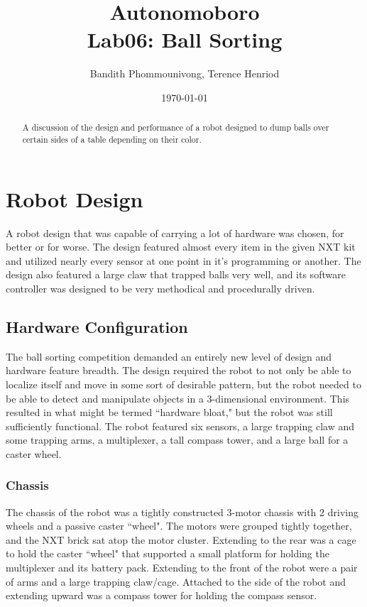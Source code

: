 \documentclass{article}
\title{Autonomoboro \\ Lab06: Ball Sorting}
\author{Bandith Phommounivong, Terence Henriod}
\date{\today}
\begin{document}
\maketitle

\begin{abstract}
A discussion of the design and performance of a robot designed to dump balls over certain sides of a table depending on their color.
\end{abstract}

\newpage
\section{Robot Design}
A robot design that was capable of carrying a lot of hardware was chosen, for better or for worse. The design featured almost every item in the given NXT kit and utilized nearly every sensor at one point in it's programming or another. The design also featured a large claw that trapped balls very well, and its software controller was designed to be very methodical and procedurally driven.

\subsection{Hardware Configuration}
The ball sorting competition demanded an entirely new level of design and hardware feature breadth. The design required the robot to not only be able to localize itself and move in some sort of desirable pattern, but the robot needed to be able to detect and manipulate objects in a 3-dimensional environment. This resulted in what might be termed ``hardware bloat," but the robot was still sufficiently functional. The robot featured six sensors, a large trapping claw and some trapping arms, a multiplexer, a tall compass tower, and a large ball for a caster wheel.

\subsubsection{Chassis}
The chassis of the robot was a tightly constructed 3-motor chassis with 2 driving wheels and a passive caster ``wheel". The motors were grouped tightly together, and the NXT brick sat atop the motor cluster. Extending to the rear was a cage to hold the caster ``wheel" that supported a small platform for holding the multiplexer and its battery pack. Extending to the front of the robot were a pair of arms and a large trapping claw/cage. Attached to the side of the robot and extending upward was a compass tower for holding the compass sensor.
\end{document}

